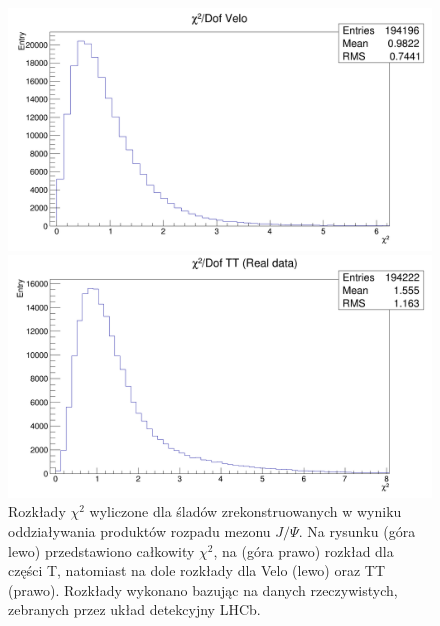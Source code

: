 \begin{figure}[H]
\vspace*{0.5cm} %
\begin{minipage}[t]{0.55\textwidth}
\includegraphics[width=\linewidth]{rozdzial6/JPsi_chi2Velo_data.png}
\end{minipage}
\hspace{\fill}
\begin{minipage}[t]{0.55\textwidth}
\includegraphics[width=\linewidth]{rozdzial6/JPsi_chi2TT_data.png}
\end{minipage}
\caption{Rozkłady $\chi^2$ wyliczone dla śladów zrekonstruowanych w wyniku oddziaływania produktów rozpadu mezonu $J/\Psi$. Na rysunku (góra lewo) przedstawiono całkowity $\chi^2$, na (góra prawo) rozkład dla części T, natomiast na dole rozkłady dla Velo (lewo) oraz TT (prawo). Rozkłady wykonano bazując na danych rzeczywistych, zebranych przez układ detekcyjny LHCb.} \label{chi2JPsi_data}
\end{figure}  


